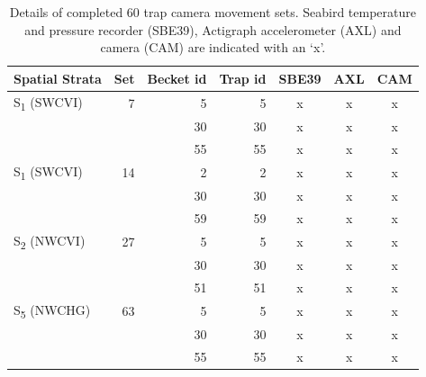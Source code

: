 \documentclass[12pt]{article}\usepackage[]{graphicx}\usepackage[]{color}
\begin{document}
\begin{table}[!h]

\caption{\label{tab:table3}Details of completed 60 trap camera movement sets. Seabird temperature and pressure recorder (SBE39), Actigraph accelerometer (AXL) and camera (CAM) are indicated with an `x'.}
\fontsize{9}{11}\selectfont
\begin{tabular}[t]{lrrrccc}
\toprule
\textbf{Spatial Strata} & \textbf{Set} & \textbf{Becket id} & \textbf{Trap id} & \textbf{SBE39} & \textbf{AXL} & \textbf{CAM}\\
\midrule
S\textsubscript{1} (SWCVI) & 7 & 5 & 5 & x & x & x\\
 &  & 30 & 30 & x & x & \vphantom{3} x\\
 &  & 55 & 55 & x & x & \vphantom{1} x\\
\midrule
S\textsubscript{1} (SWCVI) & 14 & 2 & 2 & x & x & x\\
 &  & 30 & 30 & x & x & \vphantom{2} x\\
 &  & 59 & 59 & x & x & x\\
\midrule
S\textsubscript{2} (NWCVI) & 27 & 5 & 5 & x & x & x\\
 &  & 30 & 30 & x & x & \vphantom{1} x\\
 &  & 51 & 51 & x & x & x\\
\midrule
S\textsubscript{5} (NWCHG) & 63 & 5 & 5 & x & x & x\\
 &  & 30 & 30 & x & x & x\\
 &  & 55 & 55 & x & x & x\\
\bottomrule
\end{tabular}
\end{table}
\clearpage
\end{document}
